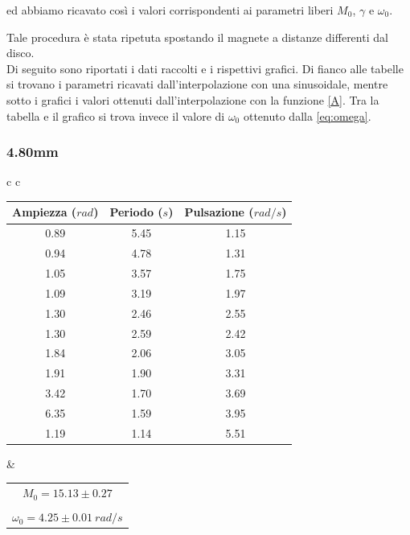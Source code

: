 ed abbiamo ricavato così i valori corrispondenti ai parametri liberi $M_0$, $\gamma$ e $\omega_0$. 

Tale procedura è stata ripetuta spostando il magnete a distanze differenti dal disco.
\\
Di seguito sono riportati i dati raccolti e i rispettivi grafici. Di fianco alle tabelle si trovano i parametri ricavati dall'interpolazione con una sinusoidale, mentre sotto i grafici i valori ottenuti dall'interpolazione con la funzione \ref{A}. Tra la tabella e il grafico si trova invece il valore di $\omega_0$ ottenuto dalla \ref{eq:omega}.

\subsubsection{4.80mm}

\begin{center}
\begin{tabular}{c c}
\begin{tabular}{c | c | c}
\textbf{Ampiezza ($rad$)} & \textbf{Periodo ($s$)} & \textbf{Pulsazione ($rad/s$)}\\
\midrule
0.89 & 5.45 & 1.15\\
0.94 & 4.78 & 1.31\\
1.05 & 3.57 & 1.75\\
1.09 & 3.19 & 1.97\\
1.30 & 2.46 & 2.55\\
1.30 & 2.59 & 2.42\\
1.84 & 2.06 & 3.05\\
1.91 & 1.90 & 3.31\\
3.42 & 1.70 & 3.69\\
6.35 & 1.59 & 3.95\\
1.19 & 1.14 & 5.51\\
\end{tabular}

& 
\begin{tabular}{c}
$M_0=15.13\pm0.27$\\
\\
$\omega_0=4.25\pm0.01\ rad/s$\\
\end{tabular} 

\end{tabular}

\end{center}
 
